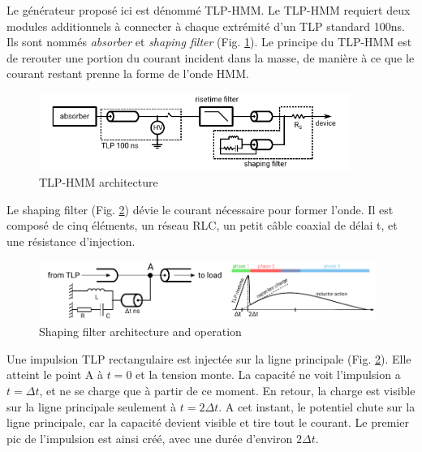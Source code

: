 Le générateur proposé ici est dénommé TLP-HMM.
Le TLP-HMM requiert deux modules additionnels à connecter à chaque extrémité d'un TLP standard 100ns.
Ils sont nommés \textit{absorber} et \textit{shaping filter} (Fig. \ref{fig:tlp_hmm_architecture}).
Le principe du TLP-HMM est de rerouter une portion du courant incident dans la masse, de manière à ce que le courant restant prenne la forme de l'onde HMM.

\begin{figure}[!h]
  \centering
  \includegraphics[width=0.9\textwidth]{src/1/figures/beges_tlp_hmm.pdf}
  \caption{TLP-HMM architecture}
  \label{fig:tlp_hmm_architecture}
\end{figure}

Le shaping filter (Fig. \ref{fig:shaping_filter_example}) dévie le courant nécessaire pour former l'onde.
Il est composé de cinq éléments, un réseau RLC, un petit câble coaxial de délai \textDelta{}t, et une résistance d'injection.

\begin{figure}[!h]
  \centering
  \includegraphics[width=0.98\textwidth]{src/1/figures/example_tlp_hmm.pdf}
  \caption{Shaping filter architecture and operation}
  \label{fig:shaping_filter_example}
\end{figure}

Une impulsion TLP rectangulaire est injectée sur la ligne principale (Fig. \ref{fig:shaping_filter_example}).
Elle atteint le point A à $t=0$ et la tension monte.
La capacité ne voit l'impulsion a $t=\Delta t$, et ne se charge que à partir de ce moment.
En retour, la charge est visible sur la ligne principale seulement à $t=2\Delta t$.
A cet instant, le potentiel chute sur la ligne principale, car la capacité devient visible et tire tout le courant.
Le premier pic de l'impulsion est ainsi créé, avec une durée d'environ $2\Delta t$.

